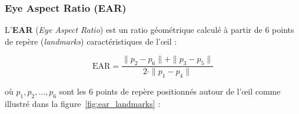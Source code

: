 \documentclass[12pt,a4paper,twoside]{report}
\newcommand{\keyword}[1]{\textbf{\textcolor{stellantisblue}{#1}}}
\begin{document}
\subsubsection{Eye Aspect Ratio (EAR)}

L'\keyword{EAR} (\textit{Eye Aspect Ratio}) \cite{soukupova2016} est un ratio géométrique calculé à partir de 6 points de repère (\textit{landmarks}) caractéristiques de l'œil :

\begin{equation}
\boxed{
\text{EAR} = \frac{\|p_2 - p_6\| + \|p_3 - p_5\|}{2 \cdot \|p_1 - p_4\|}
}
\label{eq:ear}
\end{equation}

où $p_1, p_2, \ldots, p_6$ sont les 6 points de repère positionnés autour de l'œil comme illustré dans la figure~\ref{fig:ear_landmarks} :
\end{document}
